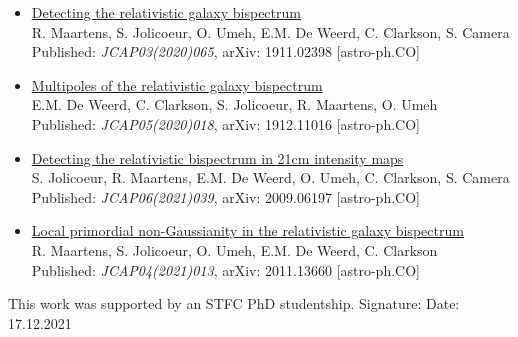 {\begin{itemize}
	Published: \textit{MNRAS Letters 486 (2019) L101},	arXiv: 1812.09512 [astro-ph.CO]
	\item \underline{Detecting the relativistic galaxy bispectrum} \\
	R. Maartens, S. Jolicoeur, O. Umeh, E.M. De Weerd, C. Clarkson, S. Camera\\
	Published: \textit{JCAP03(2020)065},	arXiv: 1911.02398 [astro-ph.CO]
	\item \underline{Multipoles of the relativistic galaxy bispectrum} \\
	E.M. De Weerd, C. Clarkson, S. Jolicoeur, R. Maartens, O. Umeh \\
	Published: \textit{JCAP05(2020)018},	arXiv: 1912.11016 [astro-ph.CO]
	\item \underline{Detecting the relativistic bispectrum in 21cm intensity maps} \\
	S. Jolicoeur, R. Maartens, E.M. De Weerd, O. Umeh, C. Clarkson, S. Camera \\
	Published: \textit{JCAP06(2021)039},	arXiv: 2009.06197 [astro-ph.CO]
	\item \underline{Local primordial non-Gaussianity in the relativistic galaxy bispectrum} \\
	R. Maartens, S. Jolicoeur, O. Umeh, E.M. De Weerd, C. Clarkson \\
	Published: \textit{JCAP04(2021)013},	arXiv: 2011.13660 [astro-ph.CO]
\end{itemize}
This work was supported by an STFC PhD studentship.
\vfill
\noindent Signature: 
\newline
Date: 17.12.2021}
\thispagestyle{empty}


\maketitle
